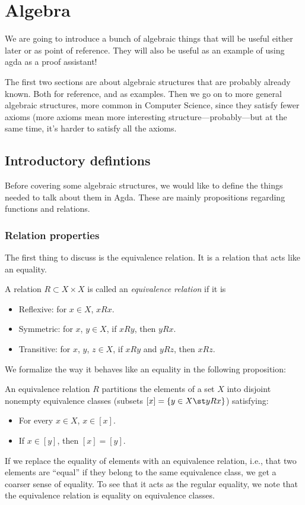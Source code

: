 \newcommand{\nanring}{nonassociative semiring}
\newcommand{\Nanring}{Nonassociative semiring}
\section{Algebra}
We are going to introduce a bunch of algebraic things that will be useful either later or as point of reference. They will also be useful as an example of using agda as a proof assistant!

The first two sections are about algebraic structures that are probably already known. Both for reference, and as examples. Then we go on to more general algebraic structures, more common in Computer Science, since they satisfy fewer axioms (more axioms mean more interesting structure---probably---but at the same time, it's harder to satisfy all the axioms.
\subsection{Introductory defintions}
Before covering some algebraic structures, we would like to define the things needed to talk about them in Agda. These are mainly propositions regarding functions and relations.
\subsubsection{Relation properties}
The first thing to discuss is the equivalence relation. It is a relation that acts like an equality.
\begin{Definition}
  A relation $R \subset X \times X$ is called an \emph{equivalence relation} if it is
  \begin{itemize}
  \item Reflexive: for $x \in X$, $x R x$.
  \item Symmetric: for $x$, $y \in X$, if $x R y$, then $y R x$.
  \item Transitive: for $x$, $y$, $z \in X$, if $x R y$ and $y R z$, then $x R z$.
  \end{itemize}
\end{Definition}
We formalize the way it behaves like an equality in the following proposition:
\begin{Proposition}
An equivalence relation $R$ partitions the elements of a set $X$ into disjoint nonempty equivalence classes (subsets $[x] = \{y \in X \st y R x\}$) satisfying: 
\begin{itemize}
\item For every $x \in X$, $x \in [x]$.
\item If $x \in [y]$, then $[x] = [y]$.
\end{itemize}
\end{Proposition}
If we replace the equality of elements with an equivalence relation, i.e., that two elements are ``equal'' if they belong to the same equivalence class, we get a coarser sense of equality. To see that it acts as the regular equality, we note that the equivalence relation is equality on equivalence classes.

